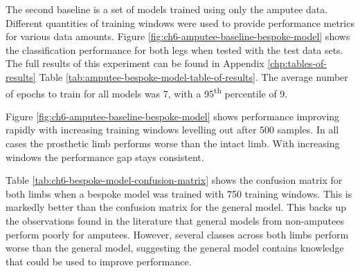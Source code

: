 The second baseline is a set of models trained using only the amputee data. Different quantities of training windows were used to provide performance metrics for various data amounts. Figure \ref{fig:ch6-amputee-baseline-bespoke-model} shows the classification performance for both legs when tested with the test data sets. The full results of this experiment can be found in  Appendix \ref{chp:tables-of-results} Table \ref{tab:amputee-bespoke-model-table-of-results}.  The average number of epochs to train for all models was 7, with a 95\textsuperscript{th} percentile of 9.

Figure \ref{fig:ch6-amputee-baseline-bespoke-model} shows performance improving rapidly with increasing training windows levelling out after 500 samples. In all cases the prosthetic limb performs worse than the intact limb. With increasing windows the performance gap stays consistent.

Table \ref{tab:ch6-bespoke-model-confusion-matrix} shows the confusion matrix for both limbs when a bespoke model was trained with 750 training windows. This is markedly better than the confusion matrix for the general model. This backs up the observations found in the literature that general models from non-amputees perform poorly for amputees\cite{Lonini2016, Jamieson2021}. However, several classes across both limbs perform worse than the general model, suggesting the general model contains knowledge that could be used to improve performance.

